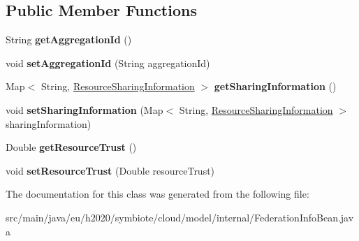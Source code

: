 \subsection*{Public Member Functions}
\begin{DoxyCompactItemize}
\item 
\mbox{\label{classeu_1_1h2020_1_1symbiote_1_1cloud_1_1model_1_1internal_1_1FederationInfoBean_affc3c77e266e552e36fa13f60c7e2384}} 
String {\bfseries get\+Aggregation\+Id} ()
\item 
\mbox{\label{classeu_1_1h2020_1_1symbiote_1_1cloud_1_1model_1_1internal_1_1FederationInfoBean_aa5ba88000c8b63355d7a9090c78a770a}} 
void {\bfseries set\+Aggregation\+Id} (String aggregation\+Id)
\item 
\mbox{\label{classeu_1_1h2020_1_1symbiote_1_1cloud_1_1model_1_1internal_1_1FederationInfoBean_aaf67913d69803246941c3a44e5c4127e}} 
Map$<$ String, \hyperlink{classeu_1_1h2020_1_1symbiote_1_1cloud_1_1model_1_1internal_1_1ResourceSharingInformation}{Resource\+Sharing\+Information} $>$ {\bfseries get\+Sharing\+Information} ()
\item 
\mbox{\label{classeu_1_1h2020_1_1symbiote_1_1cloud_1_1model_1_1internal_1_1FederationInfoBean_a3f8f771782d1704e7f723d3d0d52cc5b}} 
void {\bfseries set\+Sharing\+Information} (Map$<$ String, \hyperlink{classeu_1_1h2020_1_1symbiote_1_1cloud_1_1model_1_1internal_1_1ResourceSharingInformation}{Resource\+Sharing\+Information} $>$ sharing\+Information)
\item 
\mbox{\label{classeu_1_1h2020_1_1symbiote_1_1cloud_1_1model_1_1internal_1_1FederationInfoBean_a639a3cf2ca615cb46d5d490a0a2c00fc}} 
Double {\bfseries get\+Resource\+Trust} ()
\item 
\mbox{\label{classeu_1_1h2020_1_1symbiote_1_1cloud_1_1model_1_1internal_1_1FederationInfoBean_a8d6de66952eae1bdf073b7fa15ac3781}} 
void {\bfseries set\+Resource\+Trust} (Double resource\+Trust)
\end{DoxyCompactItemize}


The documentation for this class was generated from the following file\+:\begin{DoxyCompactItemize}
\item 
src/main/java/eu/h2020/symbiote/cloud/model/internal/Federation\+Info\+Bean.\+java\end{DoxyCompactItemize}
